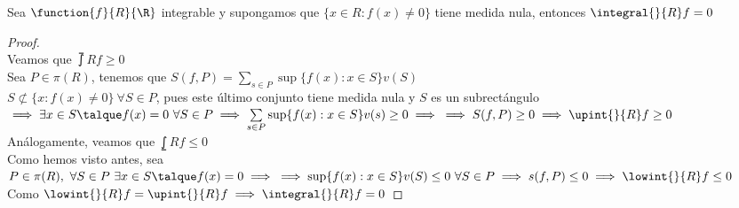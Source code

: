 	\begin{proposicion} Sea $\function{f}{R}{\R}$ integrable y supongamos que $\{x\in R:f(x)\neq 0\}$ tiene medida nula, entonces $\integral{}{R}f=0$
	\begin{proof}\ \\
	Veamos que $\upint{}{R}f\geq 0$\\
	Sea $P\in \pi(R)$, tenemos que $S(f,P)=\underset{s\in P}\sum\sup\{f(x):x\in S\}v(S)$\\
	$S\nsubset\{x:f(x)\neq 0\}\ \forall S\in P$, pues este último conjunto tiene medida nula y $S$ es un subrectángulo $\implies \exists x\in S\talque f(x)=0\ \forall S\in P\implies \underset{s\in P}\sum\sup\{f(x):x\in S\}v(s)\geq 0\implies\\\implies S(f,P)\geq 0\implies \upint{}{R}f\geq 0$\\
	Análogamente, veamos que $\lowint{}{R}f\leq 0$\\
	Como hemos visto antes, sea $P\in\pi(R),\ \forall S\in P\ \exists x\in S\talque f(x)=0\implies\\\implies \sup\{f(x):x\in S\}v(S)\leq 0\ \forall S\in P\implies s(f,P) \leq 0\implies \lowint{}{R}f\leq 0$\\
	Como $\lowint{}{R}f=\upint{}{R}f\implies \integral{}{R}f=0$
	\end{proof}
	\end{proposicion}
	
